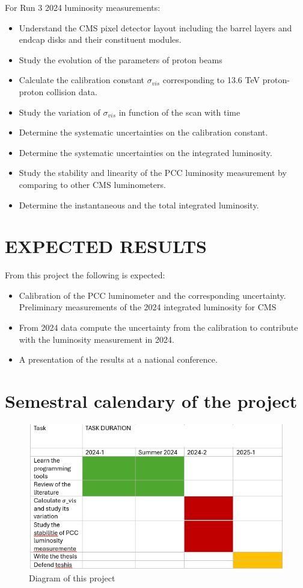 \documentclass[final,12p]{article}
\begin{document}
For Run 3 2024 luminosity measurements:
\begin{itemize}
\item Understand the CMS pixel detector layout including the barrel layers and endcap disks and their constituent modules.
\item Study the evolution of the parameters of proton beams
\item Calculate the calibration constant $\sigma_{vis}$ corresponding to 13.6 TeV proton-proton collision data.
\item Study the variation of $\sigma_{vis}$ in function of the scan with time
\item Determine the systematic uncertainties on the calibration constant.
\item Determine the systematic uncertainties on the integrated luminosity.
\item Study the stability and linearity of the PCC luminosity measurement by comparing to other CMS luminometers.
\item Determine the instantaneous and the total integrated luminosity.
\end{itemize}

\par



\newpage
\section{EXPECTED RESULTS}

From this project the following is expected:
\begin{itemize}
\item Calibration of the PCC luminometer and the corresponding uncertainty.
\iten Preliminary measurements of the 2024 integrated luminosity for CMS
\item From 2024 data compute the uncertainty from the calibration to contribute with the luminosity measurement in 2024.  
\item A presentation of the results at a national conference. 
\end{itemize}

\section{Semestral calendary of the project}

\begin{figure}[H]
  \centering
  \includegraphics[width=0.7\columnwidth]{./diagram.jpeg}
  \caption{
   Diagram of this project
  }
  \label{Grantt Diagram}
\end{figure}
\end{document}
